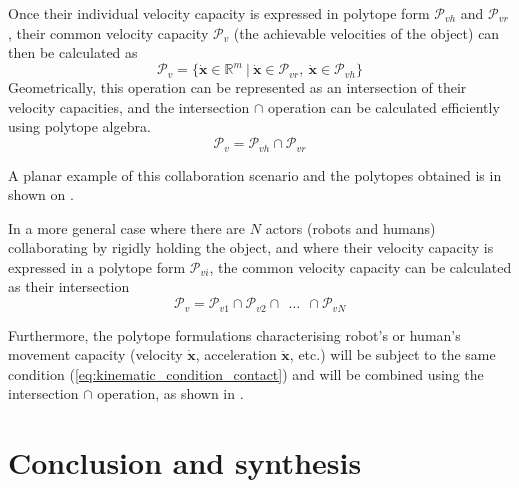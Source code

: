 Once their individual velocity capacity is expressed in polytope form $\mathcal{P}_{vh}$ and $\mathcal{P}_{vr}$, their common velocity capacity $\mathcal{P}_v$ (the achievable velocities of the object) can then be calculated as 
\begin{equation}
    \mathcal{P}_v = \{\dot{\bm{x}}\in \mathbb{R}^m ~|~ \dot{\bm{x}} \in \mathcal{P}_{vr},~\dot{\bm{x}} \in \mathcal{P}_{vh}\}
\end{equation}
Geometrically, this operation can be represented as an intersection of their velocity capacities, and the intersection $\cap$ operation can be calculated efficiently using polytope algebra. 
\begin{equation}
    \mathcal{P}_v =  \mathcal{P}_{vh} \cap \mathcal{P}_{vr}
\end{equation}

A planar example of this collaboration scenario and the polytopes obtained is in shown on . 



In a more general case where there are $N$ actors (robots and humans) collaborating by rigidly holding the object, and where their velocity capacity is expressed in a polytope form $\mathcal{P}_{vi}$, the common velocity capacity can be calculated as their intersection
\begin{equation}
    \mathcal{P}_v =  \mathcal{P}_{v1} \cap \mathcal{P}_{v2} \cap ~~ \ldots ~~\cap \mathcal{P}_{vN}
\end{equation}

Furthermore, the polytope formulations characterising robot's or human's movement capacity (velocity $\dot{\bm{x}}$, acceleration $\ddot{\bm{x}}$, etc.) will be subject to the same condition (\ref{eq:kinematic_condition_contact}) and will be combined using the intersection $\cap$ operation, as shown in .

\section{Conclusion and synthesis}
\label{ch:collab_metrics_overview}

